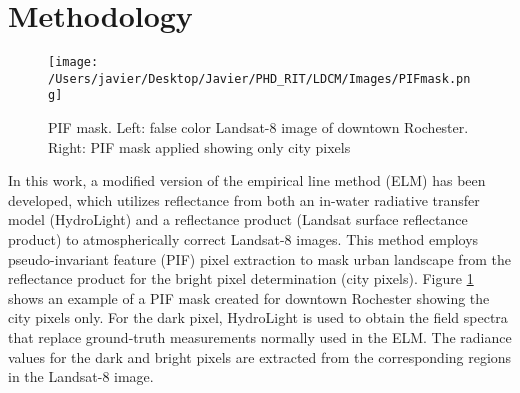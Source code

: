 \documentclass{article}
\begin{document}
\section{Methodology}
\label{sec:method}
\begin{figure}[htb]
    \centering
    \texttt{[image: /Users/javier/Desktop/Javier/PHD\_RIT/LDCM/Images/PIFmask.png]}
  \caption{PIF mask. Left: false color Landsat-8 image of downtown Rochester. Right: PIF mask applied showing only city pixels \label{fig:PIFmask} } 
\end{figure}
 In this work, a modified version of the empirical line method (ELM) has been developed, which utilizes reflectance from both an in-water radiative transfer model (HydroLight) and a reflectance product (Landsat surface reflectance product) to atmospherically correct Landsat-8 images. This method employs pseudo-invariant feature (PIF) pixel extraction \cite{Schott:1988} to mask urban landscape from the reflectance product for the bright pixel determination (city pixels). Figure \ref{fig:PIFmask} shows an example of a PIF mask created for downtown Rochester showing the city pixels only. For the dark pixel, HydroLight is used to obtain the field spectra that replace ground-truth measurements normally used in the ELM. The radiance values for the dark and bright pixels are extracted from the corresponding regions in the Landsat-8 image. %
\end{document}
